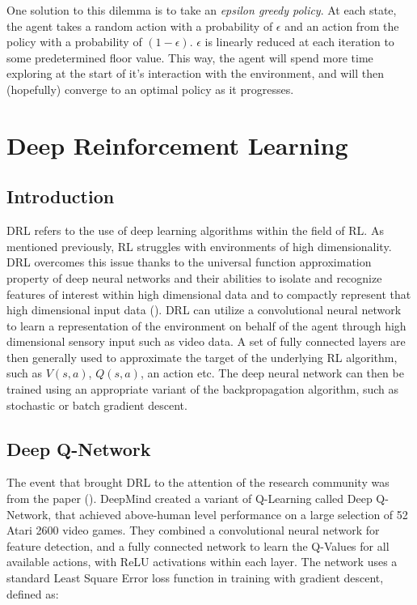 One solution to this dilemma is to take an \textit{epsilon greedy policy}. At each state, the agent
takes a random action with a probability of $\epsilon$ and an action from the policy with a
probability of $(1-\epsilon)$. $\epsilon$ is linearly reduced at each iteration to some
predetermined floor value. This way, the agent will spend more time exploring at the start of it's
interaction with the environment, and will then (hopefully) converge to an optimal policy as it progresses.

\section{Deep Reinforcement Learning}
\subsection{Introduction}
DRL refers to the use of deep learning algorithms within the field of RL. As mentioned previously, RL struggles with environments of high dimensionality. DRL overcomes this issue thanks to the universal function approximation property of deep neural networks and their abilities to isolate and recognize features of interest within high dimensional data and to compactly represent that high dimensional input data (\citet{survey-drl}). DRL can utilize a convolutional neural network to learn a representation of the environment on behalf of the agent through high dimensional sensory input such as video data. A set of fully connected layers are then generally used to approximate the target of the underlying RL algorithm, such as $V(s, a)$, $Q(s, a)$, an action etc. The deep neural network can then be trained using an appropriate variant of the backpropagation algorithm, such as stochastic or batch gradient descent. \paragraph{}

\subsection{Deep Q-Network}
The event that brought DRL to the attention of the research community was from the paper (\citet{deepmind1}). DeepMind created a variant of Q-Learning called Deep Q-Network, that achieved above-human level performance on a large selection of 52 Atari 2600 video games. They combined a convolutional neural network for feature detection, and a fully connected network to learn the Q-Values for all available actions, with ReLU activations within each layer. The network uses a standard Least Square Error loss function in training with gradient descent, defined as:

